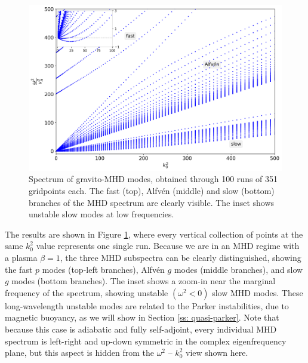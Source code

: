 \begin{figure}[t]
  \centering
  \includegraphics[width=\textwidth]{gravito_mhd.png}
  \caption{
    Spectrum of gravito-MHD modes, obtained through 100 {\legolas} runs of 351 gridpoints each. The fast (top), Alfv\'en (middle) and slow (bottom) branches of the MHD spectrum are clearly visible. The inset shows unstable slow modes at low frequencies.
  }
  \label{fig: gravito_mhd}
\end{figure}

The results are shown in Figure \ref{fig: gravito_mhd}, where every vertical collection of points at the same $k_0^2$ value represents one single {\legolas} run. Because we are in an MHD regime with a plasma $\beta = 1$, the three MHD subspectra can be clearly distinguished, showing the fast $p$ modes (top-left branches), Alfv\'en $g$ modes (middle branches), and slow $g$ modes (bottom branches). The inset shows a zoom-in near the marginal frequency of the spectrum, showing unstable $(\omega^2 < 0)$ slow MHD modes. These long-wavelength unstable modes are related to the Parker instabilities, due to magnetic buoyancy, as we will show in Section \ref{ss: quasi-parker}. Note that because this case is adiabatic and fully self-adjoint, every individual MHD spectrum is left-right and up-down symmetric in the complex eigenfrequency plane, but this aspect is hidden from the $\omega^2$ -- $k_0^2$ view shown here.


